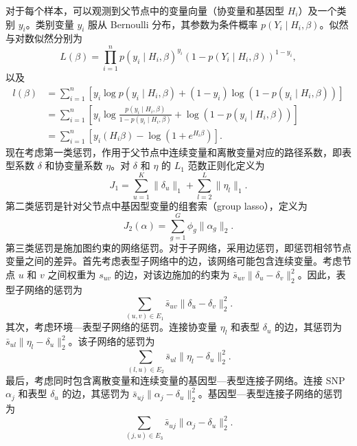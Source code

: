对于每个样本，可以观测到父节点中的变量向量（协变量和基因型 $H_i$）及一个类别 $y_i$。类别变量 $y_i$ 服从 Bernoulli 分布，其参数为条件概率 $p(Y_i\mid H_i,\beta)$。似然与对数似然分别为
\begin{equation}
L(\beta)=\prod_{i=1}^{n}
p(y_i\mid H_i,\beta)^{y_i}
(1-p(Y_i\mid H_i,\beta))^{1-y_i},
\tag{2.60}
\end{equation}
以及
\begin{equation}
\begin{aligned}
l(\beta)
&=\sum_{i=1}^{n}\left[
y_i\log p(y_i\mid H_i,\beta)
+(1-y_i)\log(1-p(y_i\mid H_i,\beta))\right]\\
&=\sum_{i=1}^{n}\left[
y_i\log\frac{p(y_i\mid H_i,\beta)}{1-p(y_i\mid H_i,\beta)}
+\log(1-p(y_i\mid H_i,\beta))\right]\\
&=\sum_{i=1}^{n}\left[y_i(H_i\beta)-\log(1+e^{H_i\beta})\right].
\end{aligned}\tag{2.61}
\end{equation}
现在考虑第一类惩罚，作用于父节点中连续变量和离散变量对应的路径系数，即表型系数 $\delta$ 和协变量系数 $\eta$。对 $\delta$ 和 $\eta$ 的 $L_1$ 范数正则化定义为
\begin{equation}
J_1=\sum_{u=1}^{K}\lVert\delta_u\rVert_1+
\sum_{l=2}^{L}\lVert\eta_l\rVert_1.
\tag{2.62}
\end{equation}
第二类惩罚是针对父节点中基因型变量的组套索（group lasso），定义为
\begin{equation}
J_2(\alpha)=\sum_{g=1}^{G}\phi_g\lVert\alpha_g\rVert_2.
\tag{2.63}
\end{equation}
第三类惩罚是施加图约束的网络惩罚。对于子网络，采用边惩罚，即惩罚相邻节点变量之间的差异。首先考虑表型子网络中的边，该网络可能包含连续变量。考虑节点 $u$ 和 $v$ 之间权重为 $s_{uv}$ 的边，对该边施加的约束为 $\bar s_{uv}\lVert\delta_u-\delta_v\rVert_2^2$。因此，表型子网络的惩罚为
\begin{equation}
\sum_{(u,v)\in E_1}\bar s_{uv}\lVert\delta_u-\delta_v\rVert_2^2.
\tag{2.64}
\end{equation}
其次，考虑环境—表型子网络的惩罚。连接协变量 $\eta_l$ 和表型 $\delta_u$ 的边，其惩罚为 $\bar s_{ul}\lVert\eta_l-\delta_u\rVert_2^2$。该子网络的惩罚为
\begin{equation}
\sum_{(l,u)\in E_2}\bar s_{ul}\lVert\eta_l-\delta_u\rVert_2^2.
\tag{2.65}
\end{equation}
最后，考虑同时包含离散变量和连续变量的基因型—表型连接子网络。连接 SNP $\alpha_j$ 和表型 $\delta_u$ 的边，其惩罚为 $\bar s_{uj}\lVert\alpha_j-\delta_u\rVert_2^2$。基因型—表型连接子网络的惩罚为
\begin{equation}
\sum_{(j,u)\in E_3}\bar s_{uj}\lVert\alpha_j-\delta_u\rVert_2^2.
\tag{2.66}
\end{equation}
